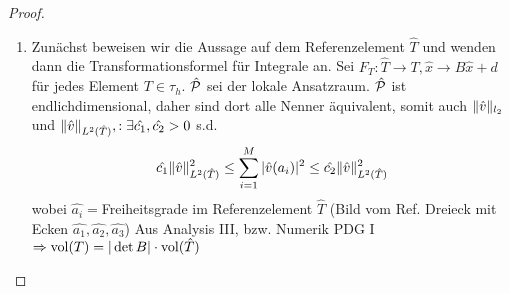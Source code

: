 \begin{proof}
  \begin{enumerate}
    \item Zunächst beweisen wir die Aussage auf dem Referenzelement $\hat{T}$ und wenden dann die Transformationsformel für Integrale an.
      Sei $F_T: \hat{T} \to T, \hat{x}\to B\hat{x}+d$ für jedes Element $T\in \tau_h$. $\hat{\mathcal{P}}$ sei der lokale Ansatzraum. $\hat{\mathcal{P}}$ ist endlichdimensional, daher sind dort alle Nenner äquivalent, somit auch $\|\hat{v}\|_{l_2}$ und $\|\hat{v}\|_{L^2(\hat{T})}, : \exists \hat{c_1}, \hat{c_2} > 0$ s.d.
      \begin{equation} %
        \hat{c_1} \norm{\hat{v}}^2_{L^2(\hat{T})} \leq \sum_{i=1}^{M} |\hat{v}(a_i)|^2 \leq \hat{c_2} \norm{\hat{v}}^2_{L^2(\hat{T})}
        \label{}
      \end{equation}
      wobei $\hat{a_i} = $Freiheitsgrade im Referenzelement $\hat{T}$ (Bild vom Ref. Dreieck mit Ecken $\hat{a_1},\hat{a_2},\hat{a_3}$)
      Aus Analysis III, bzw. Numerik PDG I $\Rightarrow \mathrm{vol}(T) = |\det B| \cdot \mathrm{vol}(\hat{T})$


\end{enumerate}
\end{proof}
